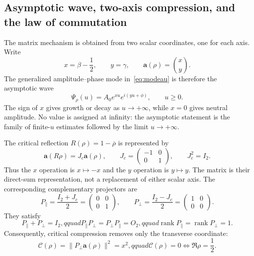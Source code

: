 \documentclass[11pt]{amsart}
\theoremstyle{definition}
\theoremstyle{remark}
\begin{document}
\subsection{Asymptotic wave, two-axis compression, and the law of commutation}
\label{subsec:asymptotic-matrix}
The matrix mechanism is obtained from two scalar coordinates, one for each axis.  Write
\begin{equation}\label{eq:two-axis-coordinate}
 x=\beta-\frac12,\qquad y=\gamma,\qquad
 \mathbf a(\rho)=\binom{x}{y}.
\end{equation}
The generalized amplitude--phase mode in~\eqref{eq:modeau} is therefore the asymptotic wave
\begin{equation}\label{eq:asymptotic-wave}
 \Psi_\rho(u)=A_0e^{xu}e^{i(yu+\phi)},\qquad u\ge0.
\end{equation}
The sign of $x$ gives growth or decay as $u\to+\infty$, while $x=0$ gives neutral
amplitude.  No value is assigned at infinity: the asymptotic statement is the family of
finite-$u$ estimates followed by the limit $u\to+\infty$.

The critical reflection $R(\rho)=1-\overline\rho$ is represented by
\begin{equation}\label{eq:Jcritical}
 \mathbf a(R\rho)=J_c\mathbf a(\rho),\qquad
 J_c=\begin{pmatrix}-1&0\\0&1\end{pmatrix},\qquad J_c^2=I_2.
\end{equation}
Thus the $x$ operation is $x\mapsto-x$ and the $y$ operation is $y\mapsto y$.
The matrix is their direct-sum representation, not a replacement of either scalar axis.
The corresponding complementary projectors are
\begin{equation}\label{eq:critical-projectors}
 P_{\parallel}=\frac{I_2+J_c}{2}
   =\begin{pmatrix}0&0\\0&1\end{pmatrix},\qquad
 P_{\perp}=\frac{I_2-J_c}{2}
   =\begin{pmatrix}1&0\\0&0\end{pmatrix}.
\end{equation}
They satisfy
\begin{equation}\label{eq:projector-algebra}
 P_{\parallel}+P_{\perp}=I_2,qquad
 P_{\parallel}P_{\perp}=P_{\perp}P_{\parallel}=O_2,qquad
 \operatorname{rank}P_{\parallel}=\operatorname{rank}P_{\perp}=1.
\end{equation}
Consequently, critical compression removes only the transverse coordinate:
\begin{equation}\label{eq:matrix-defect}
 \mathcal C(\rho)=\|P_{\perp}\mathbf a(\rho)\|^2=x^2,qquad
 \mathcal C(\rho)=0\iff\Re\rho=\frac12.
\end{equation}
\end{document}
